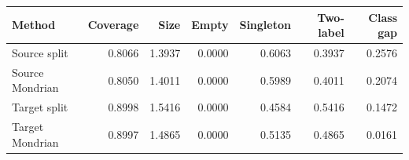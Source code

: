 \begin{tabular}{lrrrrrr}
\toprule
Method & Coverage & Size & Empty & Singleton & Two-label & Class gap \\
\midrule
Source split & 0.8066 & 1.3937 & 0.0000 & 0.6063 & 0.3937 & 0.2576 \\
Source Mondrian & 0.8050 & 1.4011 & 0.0000 & 0.5989 & 0.4011 & 0.2074 \\
Target split & 0.8998 & 1.5416 & 0.0000 & 0.4584 & 0.5416 & 0.1472 \\
Target Mondrian & 0.8997 & 1.4865 & 0.0000 & 0.5135 & 0.4865 & 0.0161 \\
\bottomrule
\end{tabular}
